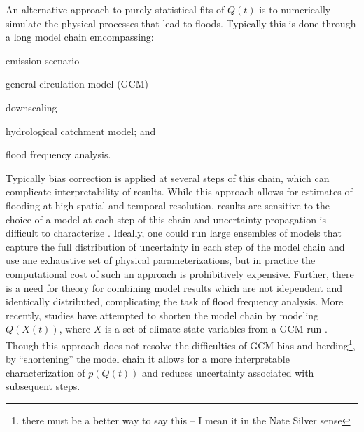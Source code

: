 \documentclass[11pt]{article}
\begin{document}
An alternative approach to purely statistical fits of $Q(t)$ is to numerically simulate the physical processes that lead to floods.
Typically this is done through a long model chain emcompassing:
\begin{enumerate*}[label=(\arabic*)]
  \item emission scenario
  \item general circulation model (GCM)
  \item downscaling
  \item hydrological catchment model; and
  \item flood frequency analysis.
\end{enumerate*}
Typically bias correction is applied at several steps of this chain, which can complicate interpretability of results.
While this approach allows for estimates of flooding at high spatial and temporal resolution, results are sensitive to the choice of a model at each step of this chain and uncertainty propagation is difficult to characterize \citep{Dankers2009,Ott2013,Dittes2017}.
Ideally, one could run large ensembles of models that capture the full distribution of uncertainty in each step of the model chain and use ane exhaustive set of physical parameterizations, but in practice the computational cost of such an approach is prohibitively expensive.
Further, there is a need for theory for combining model results which are not idependent and identically distributed, complicating the task of flood frequency analysis.
More recently, studies have attempted to shorten the model chain by modeling $Q(X(t))$, where $X$ is a set of climate state variables from a GCM run \citep{Delgado2014,Silva2016,Griffis2007,Villarini2009,Villarini2010,Hall2014}.
Though this approach does not resolve the difficulties of GCM bias and herding\footnote{there must be a better way to say this -- I mean it in the Nate Silver sense}, by ``shortening'' the model chain it allows for a more interpretable characterization of $p(Q(t))$ and reduces uncertainty associated with subsequent steps.
\end{document}
